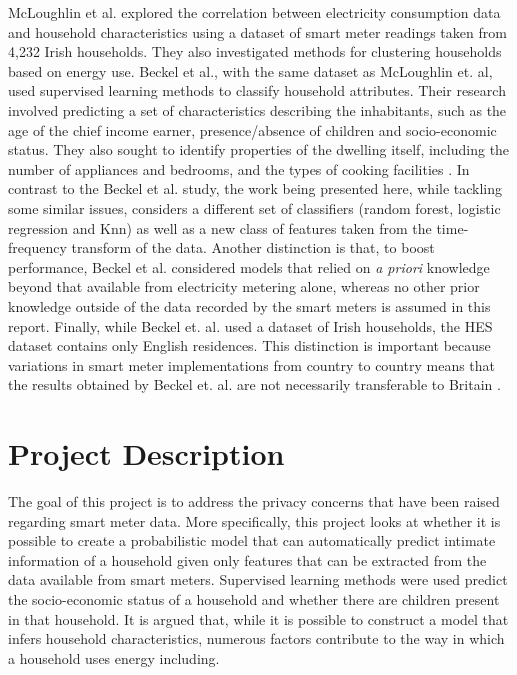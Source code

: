 McLoughlin et al. explored the correlation between electricity consumption data and household characteristics using a dataset of smart meter readings taken from 4,232 Irish households. They also investigated methods for clustering households based on energy use. Beckel et al., with the same dataset as McLoughlin et. al, used supervised learning methods to classify household attributes. Their research involved predicting a set of characteristics describing the inhabitants, such as the age of the chief income earner, presence/absence of children and socio-economic status. They also sought to identify properties of the dwelling itself, including the number of appliances and bedrooms, and the types of cooking facilities \cite{Beckel_3}. In contrast to the Beckel et al. study, the work being presented here, while tackling some similar issues, considers a different set of classifiers (random forest, logistic regression and Knn) as well as a new class of features taken from the time-frequency transform of the data. Another distinction is that, to boost performance, Beckel et al. considered models that relied on \textit{a priori} knowledge beyond that available from electricity metering alone, whereas no other prior knowledge outside of the data recorded by the smart meters is assumed in this report. Finally, while Beckel et. al. used a dataset of Irish households, the HES dataset contains only English residences. This distinction is important because variations in smart meter implementations from country to country means that the results obtained by Beckel et. al. are not necessarily transferable to Britain \cite{Anderson,Wilhite}. 




\section{Project Description}

The goal of this project is to address the privacy concerns that have been raised regarding smart meter data. More specifically, this project looks at whether it is possible to create a probabilistic model that can automatically predict intimate information of a household given only features that can be extracted from the data available from smart meters. Supervised learning methods were used predict the socio-economic status of a household and whether there are children present in that household. It is argued that, while it is possible to construct a model that infers household characteristics, numerous factors contribute to the way in which a household uses energy including.

